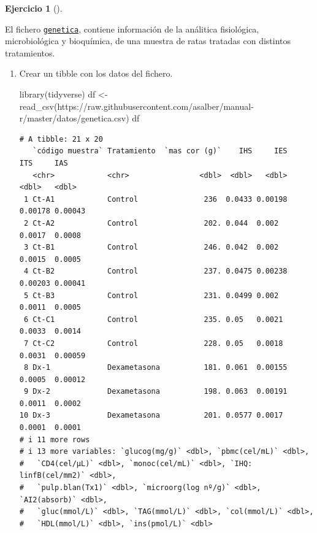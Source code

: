 \documentclass[
  a4paper,
]{scrreport}
\newenvironment{Shaded}{\begin{snugshade}}{\end{snugshade}}
\newcommand{\FunctionTok}[1]{\textcolor[rgb]{0.28,0.35,0.67}{#1}}
\newcommand{\NormalTok}[1]{\textcolor[rgb]{0.00,0.23,0.31}{#1}}
\newcommand{\OtherTok}[1]{\textcolor[rgb]{0.00,0.23,0.31}{#1}}
\newcommand{\StringTok}[1]{\textcolor[rgb]{0.13,0.47,0.30}{#1}}
\theoremstyle{definition}
\newtheorem{exercise}{Ejercicio}[chapter]
\theoremstyle{definition}
\theoremstyle{remark}
\begin{document}
\begin{exercise}[]\protect\hypertarget{exr-analisis-estadisticos-1}{}\label{exr-analisis-estadisticos-1}

El fichero
\href{https://raw.githubusercontent.com/asalber/manual-r/master/datos/genetica.csv}{\texttt{genetica}},
contiene información de la análitica fisiológica, microbiológica y
bioquímica, de una muestra de ratas tratadas con distintos tratamientos.

\begin{enumerate}
\def\labelenumi{\alph{enumi}.}
\item
  Crear un tibble con los datos del fichero.

  \begin{tcolorbox}[enhanced jigsaw, title=\textcolor{quarto-callout-note-color}{\faInfo}\hspace{0.5em}{Solución}, titlerule=0mm, toprule=.15mm, colbacktitle=quarto-callout-note-color!10!white, arc=.35mm, colframe=quarto-callout-note-color-frame, opacitybacktitle=0.6, coltitle=black, left=2mm, colback=white, opacityback=0, breakable, bottomrule=.15mm, toptitle=1mm, leftrule=.75mm, bottomtitle=1mm, rightrule=.15mm]

\begin{Shaded}
\begin{Highlighting}[]
\FunctionTok{library}\NormalTok{(tidyverse)}
\NormalTok{df }\OtherTok{\textless{}{-}} \FunctionTok{read\_csv}\NormalTok{(}\StringTok{\textquotesingle{}https://raw.githubusercontent.com/asalber/manual{-}r/master/datos/genetica.csv\textquotesingle{}}\NormalTok{)}
\NormalTok{df}
\end{Highlighting}
\end{Shaded}

\begin{verbatim}
# A tibble: 21 x 20
   `código muestra` Tratamiento  `mas cor (g)`    IHS     IES     ITS     IAS
   <chr>            <chr>                <dbl>  <dbl>   <dbl>   <dbl>   <dbl>
 1 Ct-A1            Control               236  0.0433 0.00198 0.00178 0.00043
 2 Ct-A2            Control               202. 0.044  0.002   0.0017  0.0008 
 3 Ct-B1            Control               246. 0.042  0.002   0.0015  0.0005 
 4 Ct-B2            Control               237. 0.0475 0.00238 0.00203 0.00041
 5 Ct-B3            Control               231. 0.0499 0.002   0.0011  0.0005 
 6 Ct-C1            Control               235. 0.05   0.0021  0.0033  0.0014 
 7 Ct-C2            Control               228. 0.05   0.0018  0.0031  0.00059
 8 Dx-1             Dexametasona          181. 0.061  0.00155 0.0005  0.00012
 9 Dx-2             Dexametasona          198. 0.063  0.00191 0.0011  0.0002 
10 Dx-3             Dexametasona          201. 0.0577 0.0017  0.0001  0.0001 
# i 11 more rows
# i 13 more variables: `glucog(mg/g)` <dbl>, `pbmc(cel/mL)` <dbl>,
#   `CD4(cel/µL)` <dbl>, `monoc(cel/mL)` <dbl>, `IHQ: linfB(cel/mm2)` <dbl>,
#   `pulp.blan(Tx1)` <dbl>, `microorg(log nº/g)` <dbl>, `AI2(absorb)` <dbl>,
#   `gluc(mmol/L)` <dbl>, `TAG(mmol/L)` <dbl>, `col(mmol/L)` <dbl>,
#   `HDL(mmol/L)` <dbl>, `ins(pmol/L)` <dbl>
\end{verbatim}


\end{tcolorbox}
\end{enumerate}
\end{exercise}
\end{document}
